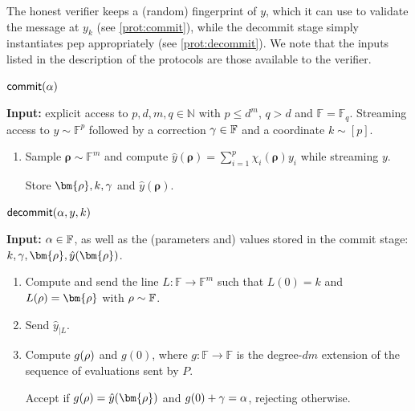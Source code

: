 \documentclass[10pt,a4paper]{article}
\newif\iflipics\lipicsfalse
\theoremstyle{definition}
\newcommand{\N}{\mathbb N}
\newcommand{\field}{\mathbb{F}}
\newcommand{\pepprotocol}{\textsf{pep}\xspace}
\newcommand{\pcommitlength}{p}
\newcommand{\pcommitstring}{y}
\newcommand{\dimension}{m}
\newcommand{\degree}{d}
\newcommand{\fieldsize}{q}
\newcommand{\fingerprinttuple}{\bm{\rho}}
\renewcommand{\line}{L}
\def\fe#1{
    \ifnum#1=1
        \alpha
    \else
    \ifnum#1=2
        \beta
    \else
    \ifnum#1=3
        \gamma
    \fi\fi\fi
}
\def\rfe#1{
    \ifnum#1=1
        \rho
    \else
    \ifnum#1=2
        \sigma
    \else
    \fi\fi
}
\begin{document}
The honest verifier keeps a (random) fingerprint of $\pcommitstring$, which it can use to validate the message at $\pcommitstring_k$ (see \cref{prot:commit}), while the \textsf{decommit} stage simply instantiates \pepprotocol appropriately (see \cref{prot:decommit}). We note that the inputs listed in the description of the protocols are those available to the verifier.

\iflipics
\begin{figure}
\else
\begin{protocol}[label={prot:commit}]{$\textsf{commit}(\fe1)$}
\fi
	\textbf{Input:} explicit access to $\pcommitlength, \degree, \dimension, \fieldsize \in \N$ with $\pcommitlength \leq \degree^\dimension$, $\fieldsize > \degree$ and $\field = \field_\fieldsize$. Streaming access to $\pcommitstring\sim\field^\pcommitlength$ followed by a correction $\fe3 \in \field$ and a coordinate $k \sim [\pcommitlength]$.
	\begin{enumerate}
	    \item[$\bm V$:] Sample $\fingerprinttuple \sim \field^\dimension$ and compute $\hat \pcommitstring(\fingerprinttuple) = \sum_{i = 1}^\pcommitlength \chi_i(\fingerprinttuple) \pcommitstring_i$ while streaming $\pcommitstring$.
	    
	    Store $\fingerprinttuple, k, \fe3$ and $\hat \pcommitstring(\fingerprinttuple)$.
	\end{enumerate}
\iflipics
\caption{Protocol $\textsf{commit}(\fe1)$}
\label{prot:commit}
\end{figure}
\else
\end{protocol}
\fi

\iflipics
\begin{figure}
\else
\begin{protocol}[label={prot:decommit}]{$\textsf{decommit}(\fe1, \pcommitstring, k)$}
\fi
    \textbf{Input:} $\fe1 \in \field$, as well as the (parameters and) values stored in the \textsf{commit} stage: $k, \fe3, \fingerprinttuple, \hat \pcommitstring(\fingerprinttuple)$.
    \begin{enumerate}[label={}]      
        \item[$\bm V$:] Compute and send the line $\line:\field\to\field^\dimension$ such that $\line(0) = k$ and $\line(\rfe1)=\fingerprinttuple$ with $\rfe1\sim\field$.

        \item[$\bm P$:] Send $\hat y_{|\line}$.

        \item[$\bm V$:] Compute $g(\rfe1)$ and $g(0)$, where $g: \field \to \field$ is the degree-$\degree\dimension$  extension of the sequence of evaluations sent by $P$.
        
        Accept if $g(\rfe1) = \hat \pcommitstring(\fingerprinttuple)$ and $g(0) + \fe3 = \fe1$, rejecting otherwise.
    \end{enumerate}
\iflipics
\caption{Protocol $\textsf{decommit}(\fe1, \pcommitstring, k)$}
\label{prot:decommit}
\end{figure}
\else
\end{protocol}
\fi
\end{document}
